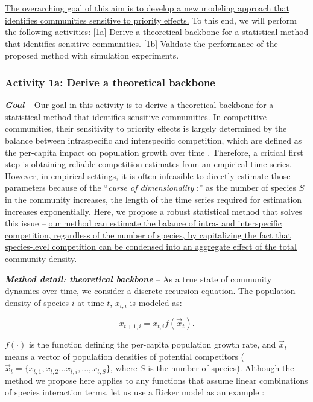 \documentclass[12pt, class=article, crop=false]{standalone}
\begin{document}
\ul{The overarching goal of this aim is to develop a new modeling approach that identifies communities sensitive to priority effects.}
To this end, we will perform the following activities:
[1a] Derive a theoretical backbone for a statistical method that identifies sensitive communities.
[1b] Validate the performance of the proposed method with simulation experiments.

\subsubsection*{Activity 1a: Derive a theoretical backbone}

\textbf{\textit{Goal}} -- 
Our goal in this activity is to derive a theoretical backbone for a statistical method that identifies sensitive communities.
In competitive communities, their sensitivity to priority effects is largely determined by the balance between intraspecific and interspecific competition, which are defined as the per-capita impact on population growth over time \citep{chesson_mechanisms_2000, barabas_chessons_2018, ke_coexistence_2018, terui_intentional_2023}.
Therefore, a critical first step is obtaining reliable competition estimates from an empirical time series.
However, in empirical settings, it is often infeasible to directly estimate those parameters because of the ``\textit{curse of dimensionality} \citep{ovaskainen_how_2017}:'' as the number of species $S$ in the community increases, the length of the time series required for estimation increases exponentially.
Here, we propose a robust statistical method that solves this issue -- \ul{our method can estimate the balance of intra- and interspecific competition, regardless of the number of species, by capitalizing the fact that species-level competition can be condensed into an aggregate effect of the total community density}.

\textbf{\textit{Method detail: theoretical backbone}} -- 
As a true state of community dynamics over time, we consider a discrete recursion equation. The population density of species $i$ at time $t$, $x_{t,i}$ is modeled as:

\begin{equation}
\label{eq:m0}
x_{t + 1, i} = x_{t, i} f(\overset{\rightarrow}{x}_{t}).
\end{equation}

$f(\cdot)$ is the function defining the per-capita population growth rate, and $\overset{\rightarrow}{x}_{t}$ means a vector of population densities of potential competitors ($\overset{\rightarrow}{x}_{t} = \{x_{t,1}, x_{t,2}...x_{t,i},...,x_{t,S}\}$, where $S$ is the number of species).
Although the method we propose here applies to any functions that assume linear combinations of species interaction terms, let us use a Ricker model as an example \citep{ricker_stock_1954, fowler_species_2012, terui_intentional_2023}:
\end{document}
